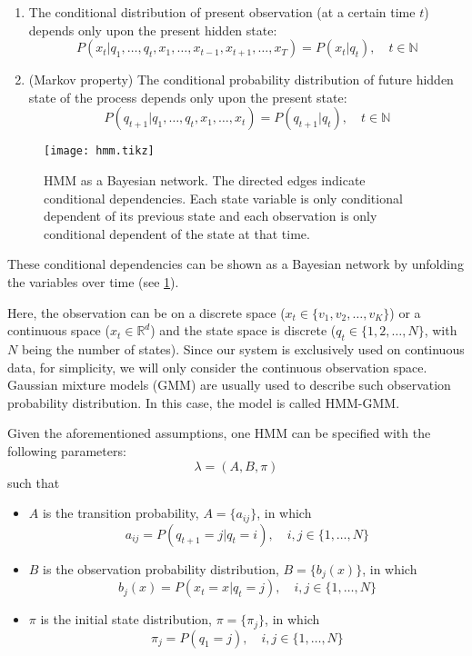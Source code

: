 \documentclass[12pt,final,twoside]{report}
\begin{document}
\begin{enumerate}
  \item The conditional distribution of present observation (at a certain time $t$) depends only upon the present hidden state:
  \begin{equation}
    P(x_t|q_1, \dots, q_t, x_1, \dots, x_{t-1},x_{t+1},\dots,x_T) = P(x_t|q_t), \quad t \in \mathbb{N} 
    \label{eq:ob_prob}
  \end{equation}
  \item (Markov property) The conditional probability distribution of future hidden state of the process depends only upon the present state:
  \begin{equation}
    P(q_{t+1}|q_1, \dots, q_t, x_1, \dots, x_t) = P(q_{t+1}|q_t),\quad t \in \mathbb{N}
    \label{eq:markov_prop}
  \end{equation}
\end{enumerate}

\begin{figure}[t]
  \centering
  \texttt{[image: hmm.tikz]}
  \caption[HMM as a Bayesian network.]{HMM as a Bayesian network. The directed edges indicate conditional dependencies. Each state variable is only conditional dependent of its previous state and each observation is only conditional dependent of the state at that time.}
  \label{fig:hmm}
\end{figure}

These conditional dependencies can be shown as a Bayesian network by unfolding the variables over time (see \cref{fig:hmm}).

Here, the observation can be on a discrete space ($x_t \in \{v_1, v_2, \dots, v_K\}$) or a continuous space ($x_t \in \mathbb{R}^d$) and the state space is discrete ($q_t \in \{1, 2, \dots, N\}$, with $N$ being the number of states). Since our system is exclusively used on continuous data, for simplicity, we will only consider the continuous observation space. Gaussian mixture models (GMM) are usually used to describe such observation probability distribution. In this case, the model is called HMM-GMM.

Given the aforementioned assumptions, one HMM can be specified with the following parameters:
\[ \lambda = (A, B, \pi) \]
such that
\begin{itemize}
  \item $A$ is the transition probability, $A = \{a_{ij}\}$, in which 
    \[ a_{ij} = P(q_{t+1} = j | q_t = i), \quad i,j \in \{1, \dots, N\} \]
  \item $B$ is the observation probability distribution, $B = \{b_j(x)\}$, in which
    \[ b_j(x) = P(x_t = x | q_t = j), \quad i,j \in \{1, \dots, N\} \]
  \item $\pi$ is the initial state distribution, $\pi = \{\pi_j\}$, in which
    \[ \pi_j = P(q_1 = j), \quad i,j \in \{1, \dots, N\} \]
\end{itemize}
\end{document}
